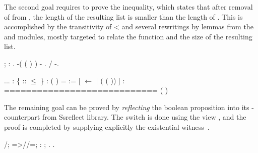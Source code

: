 The second goal requires to prove the inequality, which states that
after removal of  from , the length of the resulting list
 is smaller than the length of . This is accomplished by the
transitivity of < and several rewritings by lemmas from the 
and  modules, mostly targeted to relate the  function
and the size of the resulting list.


\begin{coqdoccode}
\coqdocemptyline
\coqdocnoindent
{}   ; :  .\coqdoceol
\coqdocnoindent
{} -( ( ) ) - .\coqdoceol
\coqdocnoindent
{} /   -.\coqdoceol
\coqdocemptyline
\end{coqdoccode}
\coqdoceol
\coqdocemptyline
\coqdocindent{1.00em}
...\coqdoceol
\coqdocindent{1.00em}
 : \{  ::  \ensuremath{\le} \}\coqdoceol
\coqdocindent{1.00em}
 : (  ) = \coqdoceol
\coqdocindent{1.00em}
 := [  \ensuremath{\leftarrow}  \ensuremath{|} ( ( )) ] :  \coqdoceol
\coqdocindent{1.00em}
============================\coqdoceol
\coqdocindent{1.50em}
 ( ) 

\coqdocemptyline


The remaining goal can be proved by \textit{reflecting} the boolean
proposition  into its -counterpart  from Ssreflect
library. The switch is done using the view , and the proof is
completed by supplying explicitly the existential witness~.


\begin{coqdoccode}
\coqdocemptyline
\coqdocnoindent
{} /; \coqdoctac{\ensuremath{\exists}} =>//=; : ;   .\coqdoceol
\coqdocnoindent
{}.\coqdoceol
\coqdocemptyline
\coqdocemptyline
\end{coqdoccode}
